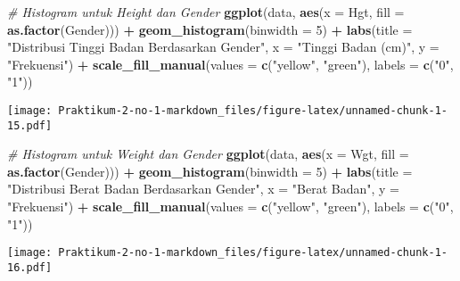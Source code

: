 \documentclass[
]{article}
\newenvironment{Shaded}{\begin{snugshade}}{\end{snugshade}}
\newcommand{\AttributeTok}[1]{\textcolor[rgb]{0.13,0.29,0.53}{#1}}
\newcommand{\CommentTok}[1]{\textcolor[rgb]{0.56,0.35,0.01}{\textit{#1}}}
\newcommand{\DecValTok}[1]{\textcolor[rgb]{0.00,0.00,0.81}{#1}}
\newcommand{\FunctionTok}[1]{\textcolor[rgb]{0.13,0.29,0.53}{\textbf{#1}}}
\newcommand{\NormalTok}[1]{#1}
\newcommand{\SpecialCharTok}[1]{\textcolor[rgb]{0.81,0.36,0.00}{\textbf{#1}}}
\newcommand{\StringTok}[1]{\textcolor[rgb]{0.31,0.60,0.02}{#1}}
\begin{document}
\begin{Shaded}
\begin{Highlighting}[]
\CommentTok{\# Histogram untuk Height dan Gender}
\FunctionTok{ggplot}\NormalTok{(data, }\FunctionTok{aes}\NormalTok{(}\AttributeTok{x =}\NormalTok{ Hgt, }\AttributeTok{fill =} \FunctionTok{as.factor}\NormalTok{(Gender))) }\SpecialCharTok{+}
  \FunctionTok{geom\_histogram}\NormalTok{(}\AttributeTok{binwidth =} \DecValTok{5}\NormalTok{) }\SpecialCharTok{+}
  \FunctionTok{labs}\NormalTok{(}\AttributeTok{title =} \StringTok{"Distribusi Tinggi Badan Berdasarkan Gender"}\NormalTok{,}
       \AttributeTok{x =} \StringTok{"Tinggi Badan (cm)"}\NormalTok{,}
       \AttributeTok{y =} \StringTok{"Frekuensi"}\NormalTok{) }\SpecialCharTok{+}
  \FunctionTok{scale\_fill\_manual}\NormalTok{(}\AttributeTok{values =} \FunctionTok{c}\NormalTok{(}\StringTok{"yellow"}\NormalTok{, }\StringTok{"green"}\NormalTok{), }\AttributeTok{labels =} \FunctionTok{c}\NormalTok{(}\StringTok{"0"}\NormalTok{, }\StringTok{"1"}\NormalTok{))}
\end{Highlighting}
\end{Shaded}

\texttt{[image: Praktikum-2-no-1-markdown\_files/figure-latex/unnamed-chunk-1-15.pdf]}

\begin{Shaded}
\begin{Highlighting}[]
\CommentTok{\# Histogram untuk Weight dan Gender}
\FunctionTok{ggplot}\NormalTok{(data, }\FunctionTok{aes}\NormalTok{(}\AttributeTok{x =}\NormalTok{ Wgt, }\AttributeTok{fill =} \FunctionTok{as.factor}\NormalTok{(Gender))) }\SpecialCharTok{+}
  \FunctionTok{geom\_histogram}\NormalTok{(}\AttributeTok{binwidth =} \DecValTok{5}\NormalTok{) }\SpecialCharTok{+}
  \FunctionTok{labs}\NormalTok{(}\AttributeTok{title =} \StringTok{"Distribusi Berat Badan Berdasarkan Gender"}\NormalTok{,}
       \AttributeTok{x =} \StringTok{"Berat Badan"}\NormalTok{,}
       \AttributeTok{y =} \StringTok{"Frekuensi"}\NormalTok{) }\SpecialCharTok{+}
  \FunctionTok{scale\_fill\_manual}\NormalTok{(}\AttributeTok{values =} \FunctionTok{c}\NormalTok{(}\StringTok{"yellow"}\NormalTok{, }\StringTok{"green"}\NormalTok{), }
                    \AttributeTok{labels =} \FunctionTok{c}\NormalTok{(}\StringTok{"0"}\NormalTok{, }\StringTok{"1"}\NormalTok{))}
\end{Highlighting}
\end{Shaded}

\texttt{[image: Praktikum-2-no-1-markdown\_files/figure-latex/unnamed-chunk-1-16.pdf]}
\end{document}

